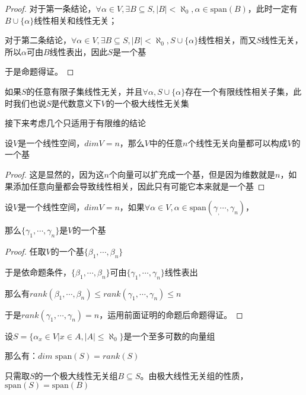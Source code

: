 \documentclass[12pt, a4paper, oneside, UTF8]{ctexbook}
\begin{document}
\begin{para}{0}
\begin{proof}
						对于第一条结论，$\forall \alpha \in V,\exists B \subseteq S,|B| < \aleph_0,\alpha \in \text{span}(B)$，此时一定有$B \cup \{\alpha \}$线性相关和线性无关；

						对于第二条结论，$\forall \alpha \in V,\exists B \subseteq S,|B| < \aleph_0,S \cup \{\alpha \}$线性相关，而又$S$线性无关，所以$\alpha $可由$B$线性表出，因此$S$是一个基

						于是命题得证。
					\end{proof}
					如果$S$的任意有限子集线性无关，并且$\forall \alpha ,S \cup \{\alpha \}$存在一个有限线性相关子集，此时我们也说$S$是代数意义下$V$的一个极大线性无关集
				
					接下来考虑几个只适用于有限维的结论	
				\point{}
					\begin{proposition}
						设$V$是一个线性空间，$dim V=n$，那么$V$中的任意$n$个线性无关向量都可以构成$V$的一个基
					\end{proposition}
					\begin{proof}
						这是显然的，因为这$n$个向量可以扩充成一个基，但是因为维数就是$n$，如果添加任意向量都会导致线性相关，因此只有可能它本来就是一个基
					\end{proof}
				\point{}
					\begin{proposition}
						设$V$是一个线性空间，$dim V=n$，如果$\forall \alpha \in V,\alpha \in \text{span}(\gamma_,\cdots,\gamma_n)$，

						那么$\{\gamma_1,\cdots,\gamma_n\}$是$V$的一个基
					\end{proposition}
					\begin{proof}
						任取$V$的一个基$\{\beta_1,\cdots,\beta_n\}$

						于是依命题条件，$\{\beta_1,\cdots,\beta_n\}$可由$\{\gamma_1,\cdots,\gamma_n\}$线性表出

						那么有$rank(\beta_1,\cdots,\beta_n) \leqslant rank(\gamma_1,\cdots,\gamma_n) \leqslant n$

						于是$rank(\gamma_1,\cdots,\gamma_n)=n$，运用前面证明的命题后命题得证。
					\end{proof}
				\point{}
					\begin{proposition}
						设$S=\{\alpha_x \in V| x \in A,|A| \leqslant \aleph_0\}$是一个至多可数的向量组

						那么有：$dim \text{ span}(S)=rank(S)$
					\end{proposition}
					\begin{proposition}
						只需取$S$的一个极大线性无关组$B \subseteq S$。由极大线性无关组的性质，$\text{span}(S)=\text{span}(B)$


\end{proposition}
\end{para}
\end{document}
